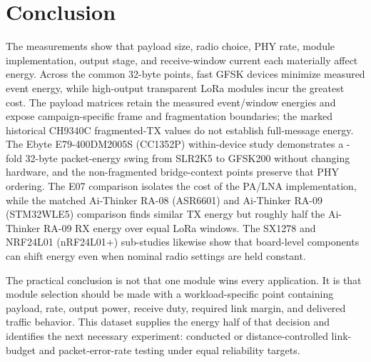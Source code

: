 \documentclass[10pt,a4paper]{article}
\begin{document}
\section{Conclusion}

The measurements show that payload size, radio choice, PHY rate, module implementation, output stage, and receive-window current each materially affect energy. Across the common 32-byte points, fast GFSK devices minimize measured event energy, while high-output transparent LoRa modules incur the greatest cost. The payload matrices retain the measured event/window energies and expose campaign-specific frame and fragmentation boundaries; the marked historical CH9340C fragmented-TX values do not establish full-message energy. The Ebyte E79-400DM2005S (CC1352P) within-device study demonstrates a \ESeventyNineImprovement-fold 32-byte packet-energy swing from SLR2K5 to GFSK200 without changing hardware, and the non-fragmented bridge-context points preserve that PHY ordering. The E07 comparison isolates the cost of the PA/LNA implementation, while the matched Ai-Thinker RA-08 (ASR6601) and Ai-Thinker RA-09 (STM32WLE5) comparison finds similar TX energy but roughly half the Ai-Thinker RA-09 RX energy over equal LoRa windows. The SX1278 and NRF24L01 (nRF24L01+) sub-studies likewise show that board-level components can shift energy even when nominal radio settings are held constant.

The practical conclusion is not that one module wins every application. It is that module selection should be made with a workload-specific point containing payload, rate, output power, receive duty, required link margin, and delivered traffic behavior. This dataset supplies the energy half of that decision and identifies the next necessary experiment: conducted or distance-controlled link-budget and packet-error-rate testing under equal reliability targets.
\end{document}
